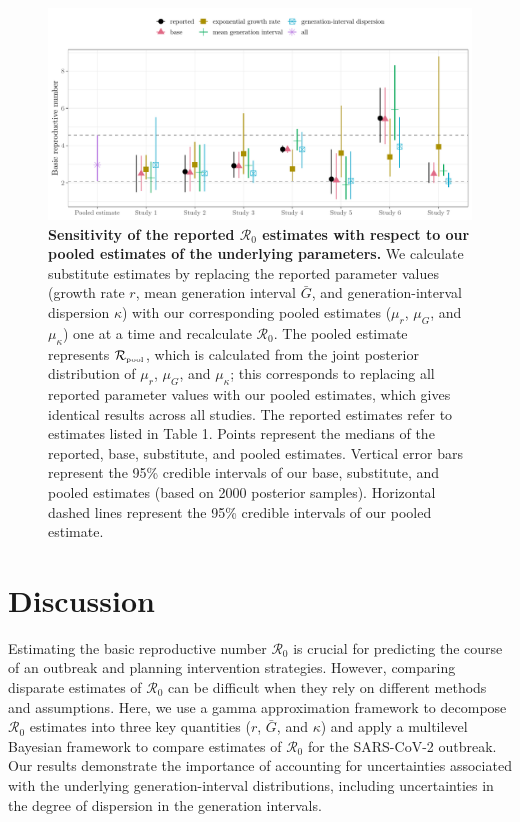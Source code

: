 \documentclass[12pt]{article}
\newcommand{\Ro}{\ensuremath{{\mathcal R}_{0}}\xspace}
\newcommand{\Rpool}{\ensuremath{{\mathcal R}_{\textrm{\tiny{pool}}}}\xspace}
\begin{document}
\begin{figure}[!th]
\includegraphics[width=\textwidth]{compare_R0.pdf}
\caption{
\textbf{Sensitivity of the reported \Ro estimates with respect to our pooled estimates of the underlying parameters.}
We calculate substitute estimates by replacing the reported parameter values (growth rate $r$, mean generation interval $\bar G$, and generation-interval dispersion $\kappa$) with our corresponding pooled estimates ($\mu_r$, $\mu_G$, and $\mu_\kappa$) one at a time and recalculate \Ro.
The pooled estimate represents \Rpool, which is calculated from the joint posterior distribution of $\mu_r$, $\mu_G$, and $\mu_\kappa$;
this corresponds to replacing all reported parameter values with our pooled estimates, which gives identical results across all studies.
The reported estimates refer to estimates listed in Table 1.
Points represent the medians of the reported, base, substitute, and pooled estimates.
Vertical error bars represent the 95\% credible intervals of our base, substitute, and pooled estimates (based on 2000 posterior samples).
Horizontal dashed lines represent the 95\% credible intervals of our pooled estimate.
}
\label{fig:R0}
\end{figure}

\section{Discussion}

Estimating the basic reproductive number \Ro is crucial for predicting the course of an outbreak and planning intervention strategies.
However, comparing disparate estimates of \Ro can be difficult when they rely on different methods and assumptions.
Here, we use a gamma approximation framework \citep{park2019practical} to decompose \Ro estimates into three key quantities ($r$, $\bar G$, and $\kappa$) and apply a multilevel Bayesian framework to compare estimates of \Ro for the SARS-CoV-2 outbreak.
Our results demonstrate the importance of accounting for uncertainties associated with the underlying generation-interval distributions, including uncertainties in the degree of dispersion in the generation intervals.
\end{document}
